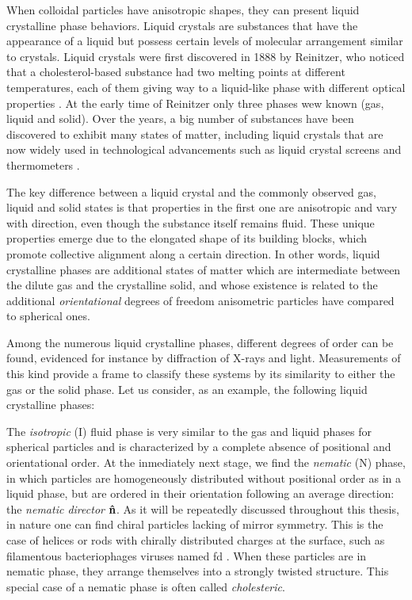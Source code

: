 When colloidal particles have anisotropic shapes, they can present liquid crystalline phase behaviors. Liquid crystals are substances that have the appearance of a liquid but possess certain levels of molecular arrangement similar to crystals. Liquid crystals were first discovered in 1888 by Reinitzer, who noticed that a cholesterol-based substance had two melting points at different temperatures, each of them giving way to a liquid-like phase with different optical properties \cite{reinitzer1888beitrage}. At the early time of Reinitzer only three phases wew known (gas, liquid and solid). Over the years, a big number of substances have been discovered to exhibit many states of matter, including liquid crystals that are now widely used in technological advancements such as liquid crystal screens and thermometers \cite{Li_2012}.

The key difference between a liquid crystal and the commonly observed gas, liquid and solid states is that properties in the first one are anisotropic and vary with direction, even though the substance itself remains fluid. These unique properties emerge due to the elongated shape of its building blocks, which promote collective alignment along a certain direction. In other words, liquid crystalline phases are additional states of matter which are intermediate between the dilute gas and the crystalline solid, and whose existence is related to the additional {\em orientational} degrees of freedom anisometric particles have compared to spherical ones.

Among the numerous liquid crystalline phases, different degrees of order can be found, evidenced for instance by diffraction of X-rays and light. Measurements of this kind provide a frame to classify these systems by its similarity to either the gas or the solid phase. Let us consider, as an example, the following liquid crystalline phases:

The {\em isotropic} (I) fluid phase is very similar to the gas and liquid phases for spherical particles and is characterized by a complete absence of positional and orientational order. At the inmediately next stage, we find the {\em nematic} (N) phase, in which particles are homogeneously distributed without positional order as in a liquid phase, but are ordered in their orientation following an average direction: the {\em nematic director} ${\bf \hat{n}}$. As it will be repeatedly discussed throughout this thesis, in nature one can find chiral particles lacking of mirror symmetry. This is the case of helices or rods with chirally distributed charges at the surface, such as filamentous bacteriophages viruses named fd \cite{Gibaud_2017}. When these particles are in nematic phase, they arrange themselves into a strongly twisted structure. This special case of a nematic phase is often called {\em cholesteric}.

